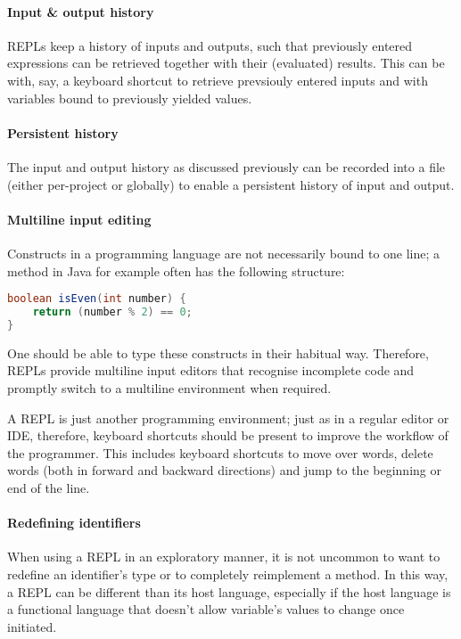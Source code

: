 \paragraph{Input \& output history} REPLs keep a history of inputs and outputs,
such that previously entered expressions can be retrieved together with their
(evaluated) results. This can be with, say, a keyboard shortcut to retrieve
prevsiouly entered inputs and with variables bound to previously yielded values.

\paragraph{Persistent history} The input and output history as discussed
previously can be recorded into a file (either per-project or globally) to
enable a persistent history of input and output.

\paragraph{Multiline input editing} Constructs in a programming language are
not necessarily bound to one line; a method in Java for example often has the
following structure:
\begin{lstlisting}[language=java]
boolean isEven(int number) {
    return (number % 2) == 0;
}
\end{lstlisting}
One should be able to type these constructs in their habitual way. Therefore,
REPLs provide multiline input editors that recognise incomplete code and
promptly switch to a multiline environment when required.

A REPL is just another programming environment; just as in a regular editor or
IDE, therefore, keyboard shortcuts should be present to improve the workflow of
the programmer. This includes keyboard shortcuts to move over words, delete
words (both in forward and backward directions) and jump to the beginning or
end of the line.

\paragraph{Redefining identifiers} When using a REPL in an exploratory manner,
it is not uncommon to want to redefine an identifier's type or to completely
reimplement a method. In this way, a REPL can be different than its host
language, especially if the host language is a functional language that doesn't
allow variable's values to change once initiated.

